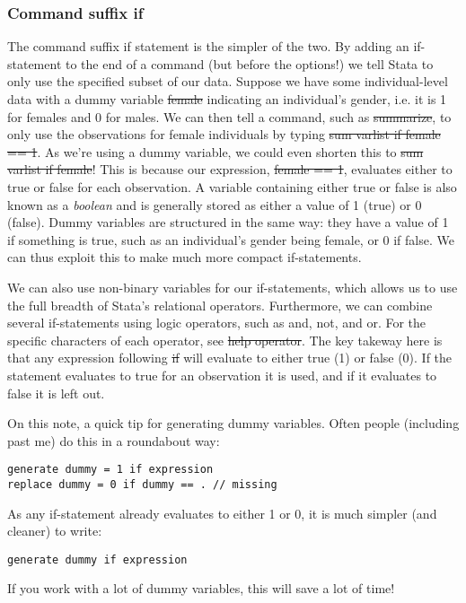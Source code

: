 \subsubsection{Command suffix if}
The command suffix if statement is the simpler of the two.
By adding an if-statement to the end of a command (but before the options!) we tell Stata to only use the specified subset of our data.
Suppose we have some individual-level data with a dummy variable \st{female} indicating an individual's gender, i.e. it is 1 for females and 0 for males.
We can then tell a command, such as \st{summarize},
to only use the observations for female individuals by typing \st{sum varlist if female == 1}.
As we're using a dummy variable, we could even shorten this to \st{sum varlist if female}!
This is because our expression, \st{female == 1},
evaluates either to true or false for each observation.
A variable containing either true or false is also known as a \emph{boolean} and is generally stored as either a value of 1 (true) or 0 (false).
Dummy variables are structured in the same way:
they have a value of 1 if something is true,
such as an individual's gender being female,
or 0 if false.
We can thus exploit this to make much more compact if-statements.

We can also use non-binary variables for our if-statements,
which allows us to use the full breadth of Stata's relational operators.
Furthermore, we can combine several if-statements using logic operators,
such as and, not, and or.
For the specific characters of each operator, see \st{help operator}.
The key takeway here is that any expression following \st{if} will evaluate to either true (1) or false (0).
If the statement evaluates to true for an observation it is used,
and if it evaluates to false it is left out.

On this note,
a quick tip for generating dummy variables.
Often people (including past me) do this in a roundabout way:
\begin{verbatim}
generate dummy = 1 if expression
replace dummy = 0 if dummy == . // missing
\end{verbatim}
As any if-statement already evaluates to either 1 or 0,
it is much simpler (and cleaner) to write:
\begin{verbatim}
generate dummy if expression
\end{verbatim}
If you work with a lot of dummy variables, this will save a lot of time!

